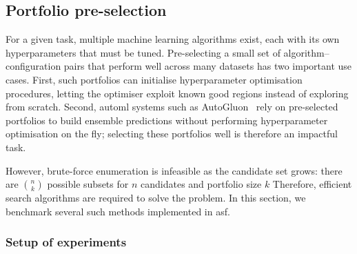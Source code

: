 

\begin{table}[t]
  \centering
    \caption[OOD-Chameleon selector matrix]{\gls{ood}-Chameleon selector matrix. Rows represent training/evaluation/model combinations, columns correspond to selectors, and cells report mean worst-group error $\pm$ standard deviation over the five seeds, in percentage points. Lower is better; bold entries mark the lowest value in a row or values within 0.5 percentage points of it.
    }
  \label{tab:ood_selector_by_scenario}
  \resizebox{\textwidth}{!}{}

\end{table}

\subsection{Portfolio pre-selection}


For a given task, multiple machine learning algorithms exist, each with its own hyperparameters that must be tuned.
Pre-selecting a small set of algorithm--configuration pairs that perform well across many datasets has two important use cases.
First, such portfolios can initialise hyperparameter optimisation procedures, letting the optimiser exploit known good regions instead of exploring from scratch.
Second, \gls{automl} systems such as AutoGluon~\citep{EriEtAl20} rely on pre-selected portfolios to build ensemble predictions without performing hyperparameter optimisation on the fly; selecting these portfolios well is therefore an impactful task.

However, brute-force enumeration is infeasible as the candidate set grows: there are $\binom{n}{k}$ possible subsets for $n$ candidates and portfolio size $k$ 
Therefore, efficient search algorithms are required to solve the problem.
In this section, we benchmark several such methods implemented in \gls{asf}.


\subsubsection{Setup of experiments}


